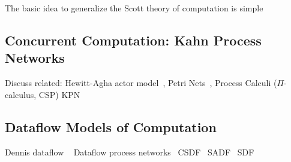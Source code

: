 The basic idea to generalize the Scott theory of computation is simple



\subsection{Concurrent Computation: Kahn Process Networks}
Discuss related: Hewitt-Agha actor model~\cite{DBLP:conf/ijcai/HewittBS73,Agha:86:Actors}, Petri Nets~\cite{petri1962nets}, Process Calculi ($\Pi$-calculus, \ac{CSP})
\Blindtext[10]\ac{KPN}~\cite{kahn74}

\subsection{Dataflow Models of Computation}
Dennis dataflow ~\cite{dennis1974first,dennis1986data}
\cite{Parks:M95/105}
Dataflow process networks~\cite{lee1995dataflow,lee_matsikoudis_semantics}
\ac{CSDF}~\cite{bilsen1996cycle}
\ac{SADF}~\cite{theelen2006scenario}
\ac{SDF}~\cite{lee1987sdf}
\Blindtext[10]



